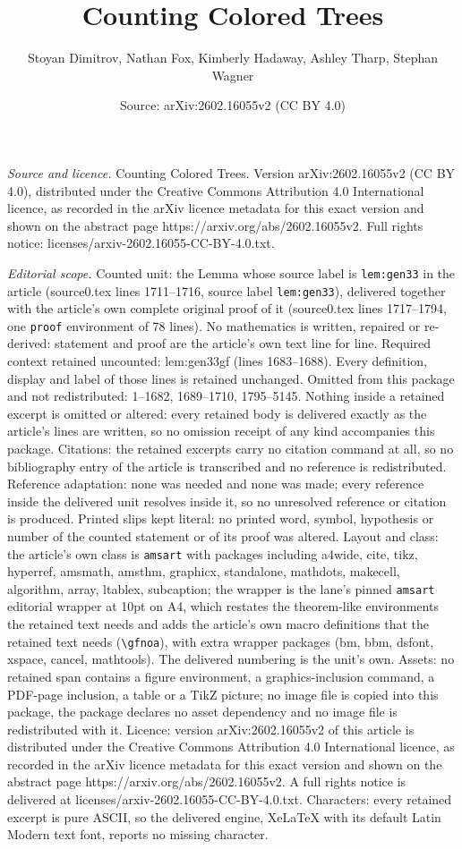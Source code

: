 \documentclass[10pt,a4paper]{amsart}
\title[Counting Colored Trees]{Counting Colored Trees}
\author{Stoyan Dimitrov, Nathan Fox, Kimberly Hadaway, Ashley Tharp, Stephan Wagner}
\date{Source: arXiv:2602.16055v2 (CC BY 4.0)}
\begin{document}
\maketitle

\noindent\emph{Source and licence.} Counting Colored Trees. Version arXiv:2602.16055v2 (CC BY 4.0), distributed under the Creative Commons Attribution 4.0 International licence, as recorded in the arXiv licence metadata for this exact version and shown on the abstract page https://arxiv.org/abs/2602.16055v2. Full rights notice: licenses/arxiv-2602.16055-CC-BY-4.0.txt.\par\smallskip

\noindent\textit{Editorial scope.} Counted unit: the Lemma whose source label is \texttt{lem:gen33} in the article (source0.tex lines 1711--1716, source label \texttt{lem:gen33}), delivered together with the article's own complete original proof of it (source0.tex lines 1717--1794, one \texttt{proof} environment of 78 lines). No mathematics is written, repaired or re-derived: statement and proof are the article's own text line for line. Required context retained uncounted: lem:gen33gf (lines 1683--1688). Every definition, display and label of those lines is retained unchanged. Omitted from this package and not redistributed: 1--1682, 1689--1710, 1795--5145. Nothing inside a retained excerpt is omitted or altered: every retained body is delivered exactly as the article's lines are written, so no omission receipt of any kind accompanies this package. Citations: the retained excerpts carry no citation command at all, so no bibliography entry of the article is transcribed and no reference is redistributed. Reference adaptation: none was needed and none was made; every reference inside the delivered unit resolves inside it, so no unresolved reference or citation is produced. Printed slips kept literal: no printed word, symbol, hypothesis or number of the counted statement or of its proof was altered. Layout and class: the article's own class is \texttt{amsart} with packages including a4wide, cite, tikz, hyperref, amsmath, amsthm, graphicx, standalone, mathdots, makecell, algorithm, array, ltablex, subcaption; the wrapper is the lane's pinned \texttt{amsart} editorial wrapper at 10pt on A4, which restates the theorem-like environments the retained text needs and adds the article's own macro definitions that the retained text needs (\texttt{\textbackslash gfnoa}), with extra wrapper packages (bm, bbm, dsfont, xspace, cancel, mathtools). The delivered numbering is the unit's own. Assets: no retained span contains a figure environment, a graphics-inclusion command, a PDF-page inclusion, a table or a TikZ picture; no image file is copied into this package, the package declares no asset dependency and no image file is redistributed with it. Licence: version arXiv:2602.16055v2 of this article is distributed under the Creative Commons Attribution 4.0 International licence, as recorded in the arXiv licence metadata for this exact version and shown on the abstract page https://arxiv.org/abs/2602.16055v2. A full rights notice is delivered at licenses/arxiv-2602.16055-CC-BY-4.0.txt. Characters: every retained excerpt is pure ASCII, so the delivered engine, XeLaTeX with its default Latin Modern text font, reports no missing character.
\end{document}

